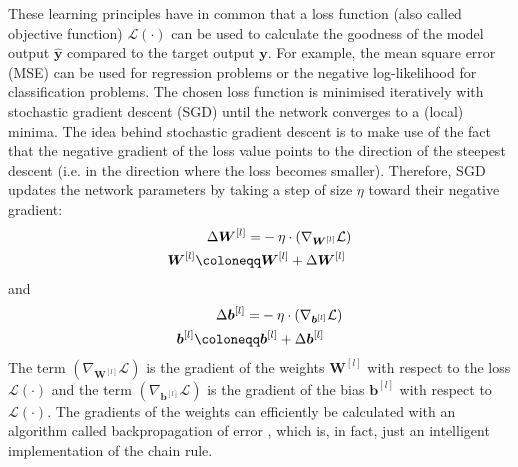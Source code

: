 These learning principles have in common that a loss function (also called objective function) $\mathcal{L}(\cdot)$ can be used to calculate the goodness of the model output $\boldsymbol{\hat{y}}$ compared to the target output ${\boldsymbol{y}}$. For example, the mean square error (MSE) can be used for regression problems or the negative log-likelihood for classification problems.
The chosen loss function is minimised iteratively with stochastic gradient descent (SGD) until the network converges to a (local) minima.
The idea behind stochastic gradient descent is to make use of the fact that the negative gradient of the loss value points to the direction of the steepest descent (i.e. in the direction where the loss becomes smaller).
Therefore, SGD updates the network parameters by taking a step of size $\eta$ toward their negative gradient:
%
\begin{align}\eqlbl{sgd}
	\begin{aligned}
		\Delta \boldsymbol{W}^{[l]} = & -\eta \cdot \left( \nabla_{\boldsymbol{W}^{[l]}} \mathcal{L} \right)\\
		\boldsymbol{W}^{[l]} \coloneqq & \boldsymbol{W}^{[l]} + \Delta \boldsymbol{W}^{[l]}
	\end{aligned}
\end{align}
%
and
%	
\begin{align}\eqlbl{sgd2}	
	\begin{aligned}
		\Delta \boldsymbol{b}^{[l]} = & -\eta \cdot \left( \nabla_{\boldsymbol{b}^{[l]}} \mathcal{L} \right)\\
		\boldsymbol{b}^{[l]} \coloneqq & \boldsymbol{b}^{[l]} + \Delta \boldsymbol{b}^{[l]}
	\end{aligned}
\end{align}
%
The term $\left( \nabla_{\boldsymbol{W}^{[l]}} \mathcal{L} \right)$ is the gradient of the weights \(\boldsymbol{W}^{[l]}\)  with respect to the loss $\mathcal{L}(\cdot)$ and the term $\left( \nabla_{\boldsymbol{b}^{[l]}} \mathcal{L} \right)$ is the gradient of the bias \(\boldsymbol{b}^{[l]}\)  with respect to $\mathcal{L}(\cdot)$.
The gradients of the weights can efficiently be calculated with an algorithm called backpropagation of error , which is, in fact, just an intelligent implementation of the chain rule.

